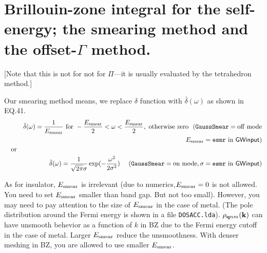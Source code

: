\documentclass[a4paper,10pt,epsf,fleqn]{article}
\newcommand{\io}[1]{{\sf  #1}}
\newcommand{\raw}[1]{{\tt #1}}
\begin{document}
\newpage
\section{Brillouin-zone integral for the self-energy; 
the smearing method and the offset-$\Gamma$ method.}
\label{kint}

[Note that this is not for not for $\Pi$---it is usually evaluated by the tetrahedron method.]

Our smearing method means, we replace $\delta$ function with $\bar{\delta}(\omega)$ as shown in EQ.41. 
\setlength{\mathindent}{-5mm}
\begin{eqnarray}
&&\bar{\delta}(\omega) = \frac{1}{E_{\rm smear}} 
{\rm \ for \ } -\frac{E_{\rm smear}}{2}<\omega <\frac{E_{\rm smear}}{2}, {\rm \  otherwise \ zero \ \ ({\tt GaussSmear}=off \ mode} \nonumber \\
&& \hspace{7cm} \ E_{\rm smear} = \raw{esmr} \ {\rm in} \ \io{GWinput})\\
\nonumber {\rm \ \ \ or} \\
&&\bar{\delta}(\omega) = \frac{1}{\sqrt{2 \pi} \sigma} \exp( -\frac{\omega^2}{2 \sigma^2}) \ \ \ {\rm \  ({\tt GaussSmear}=on \ mode, \sigma = \raw{esmr} \ in \ \io{GWinput})} \nonumber
\end{eqnarray}
\setlength{\mathindent}{0mm}

As for insulator, $E_{\rm smear}$ is irrelevant
(due to numerics,$E_{\rm smear}=0$ is not allowed. 
You need to set $E_{\rm smear}$ smaller than band gap. 
But not too small).
However, you may need to pay attention to the size of 
$E_{\rm smear}$ in the case of metal.
(The pole distribution around the Fermi energy 
is shown in a file {\tt DOSACC.lda}).
$\rho_{{\bf q}nm}({\bf k})$ can have unsmooth behevior 
as a function of $k$ in BZ due to the Fermi energy cutoff 
in the case of metal.
Larger $E_{\rm smear}$ reduce the unsmoothness.
With denser meshing in BZ, you are allowed to use smaller $E_{\rm smear}$.\\
\end{document}
